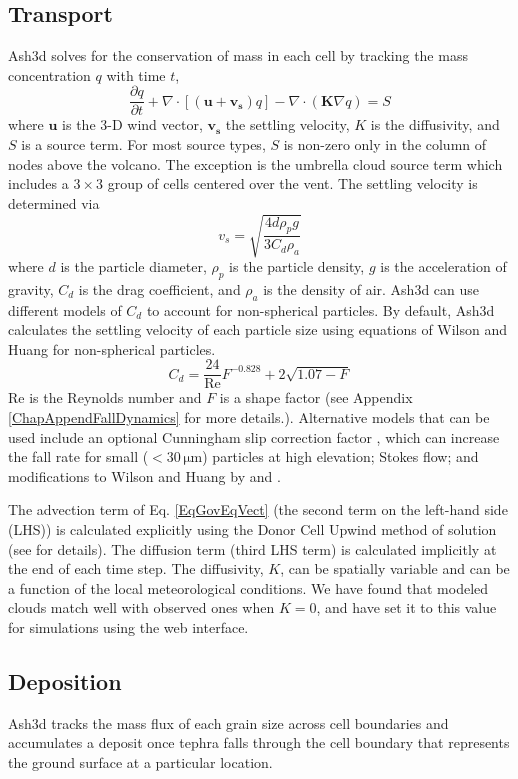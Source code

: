 \subsection{Transport}\label{ChapIntroSecTrans}
Ash3d solves for the conservation of mass in each cell by tracking the mass
concentration $q$ with time $t$,
\begin{equation}\label{EqGovEqVect}
 \frac{\partial q}{\partial t} +
   \nabla \cdot \left[ \left(\mathbf{u} + \mathbf{v_s} \right) q \right]
 - \nabla \cdot \left( \mathbf{K} \nabla q\right) = S
\end{equation}
where $\mathbf{u}$ is the 3-D wind vector,
$\mathbf{v_s}$ the settling velocity, $K$ is the
diffusivity, and $S$ is a source term.  For most source types, $S$
is non-zero only in the column of nodes above the volcano.  The
exception is the umbrella cloud source term which includes a
$3 \times 3$ group of cells centered over the vent.
The settling velocity is determined via \cite[p.182]{Bird1960}
\begin{equation}
v_s=\sqrt{\frac{4d\rho_p g}{3C_d\rho_a}}\label{EqFallVel}
\end{equation}
where $d$ is the particle diameter, $\rho_p$ is the particle density, $g$ is
the acceleration of gravity, $C_d$ is the drag coefficient, and $\rho_a$
is the density of air.
Ash3d can use different models of $C_d$ to account for non-spherical particles.
By default, Ash3d calculates the settling
velocity of each particle size using equations of Wilson and Huang \cite{Wilson1979}
for non-spherical particles.
\begin{equation}
C_d = \frac{24}{\mathrm{Re}}F^{-0.828}+2 \sqrt{1.07-F}\label{EqDragWH}
\end{equation}
$\mathrm{Re}$ is the Reynolds number and $F$ is a shape factor (see
Appendix \ref{ChapAppendFallDynamics} for more details.).
Alternative models that can be used include an
optional Cunningham slip correction factor \cite[p.407]{Seinfeld2006},
which can increase the fall rate for small ($<30 \,\mathrm{\mu m}$)
particles at high elevation;
Stokes flow; and modifications to Wilson and Huang by \cite{Ganser1993} and
\cite{Pfeiffer2005}.

The advection term of Eq. \ref{EqGovEqVect} (the second term on the left-hand side
(LHS)) is calculated explicitly using the Donor Cell Upwind method of
solution (see \cite{Schwaiger2012} for details). The diffusion term (third
LHS term) is calculated implicitly at the end of each time step. The diffusivity,
$K$, can be spatially variable and can be a function of the local meteorological
conditions. We have found that modeled clouds match well with observed ones
when $K=0$, and have set it to this value for simulations using the web interface.

\subsection{Deposition}\label{ChapIntroSecDepo}
Ash3d tracks the mass flux of each grain size across cell boundaries and
accumulates a deposit once tephra falls through the cell boundary that
represents the ground surface at a particular location.

